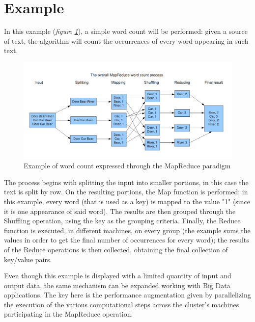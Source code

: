 \section*{Example}
In this example (\textit{figure \ref{fig:mapreduce_example}}), a simple word count will be performed: given a source of text, the algorithm will count the occurrences of every word appearing in such text.

\begin{figure}[H]
    \centering
    \includegraphics[scale=0.44]{document/appendix/appendix_1/images/mapreduce_example.png}
    \caption{Example of word count expressed through the MapReduce paradigm \cite{mapreduce_example_site}}
    \label{fig:mapreduce_example}
\end{figure}

The process begins with splitting the input into smaller portions, in this case the text is split by row. On the resulting portions, the Map function is performed; in this example, every word (that is used as a key) is mapped to the value "1" (since it is one appearance of said word). The results are then grouped through the Shuffling operation, using the key as the grouping criteria. Finally, the Reduce function is executed, in different machines, on every group (the example sums the values in order to get the final number of occurrences for every word); the results of the Reduce operations is then collected, obtaining the final collection of key/value pairs.

Even though this example is displayed with a limited quantity of input and output data, the same mechanism can be expanded working with Big Data applications. The key here is the performance augmentation given by parallelizing the execution of the various computational steps across the cluster's machines participating in the MapReduce operation.
